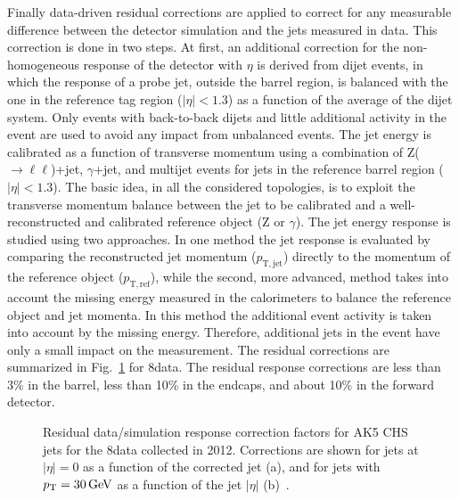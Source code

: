 Finally data-driven residual corrections are applied to correct for any measurable difference between the detector simulation and the jets measured in data. 
This correction is done in two steps. At first, an additional correction for the non-homogeneous response of the detector with $\eta$ is derived from dijet events, in which the \pt response of a probe jet, outside the barrel region, is balanced with the one in the reference tag region ($|\eta| < 1.3$) as a function of the average \pt of the dijet system. Only events with back-to-back dijets and little additional activity in the event are used to avoid any impact from unbalanced events. %
The jet energy is calibrated as a function of transverse momentum using a combination of Z($\to\ell\ell$)+jet, $\gamma$+jet, and multijet events for jets in the reference barrel region ($|\eta| < 1.3$). The basic idea, in all the considered topologies, is to exploit the transverse momentum balance between the jet to be calibrated and a well-reconstructed and calibrated reference object (Z or $\gamma$). The jet energy response is studied using two approaches. In one method the jet response is evaluated by comparing the reconstructed jet momentum ($p_\mathrm{T,jet}$) directly to the momentum of the reference object ($p_\mathrm{T,ref}$), while the second, more advanced, method takes into account the missing energy measured in the calorimeters to balance the reference object and jet momenta. In this method the additional event activity is taken into account by the missing energy. Therefore, additional jets in the event have only a small impact on the measurement. The residual corrections are summarized in Fig.~\ref{fig:rescorr_ak5chs} for 8\TeV data. The residual response corrections are less than 3\% in the barrel, less than 10\% in the endcaps, and about 10\% in the forward detector.

\begin{figure}[!htb]
\centering
{}
\caption{Residual data/simulation response correction factors for AK5 CHS jets for the 8\TeV data collected in 2012. Corrections are shown for jets at $|\eta| = 0$ as a function of the corrected jet \pt (a), and for jets with $p_{\mathrm{T}} = 30\,\text{Ge\hspace{-.08em}V}$ as a function of the jet $|\eta|$ (b)~\cite{Khachatryan:2016kdb}.}
\label{fig:rescorr_ak5chs}
\end{figure}


